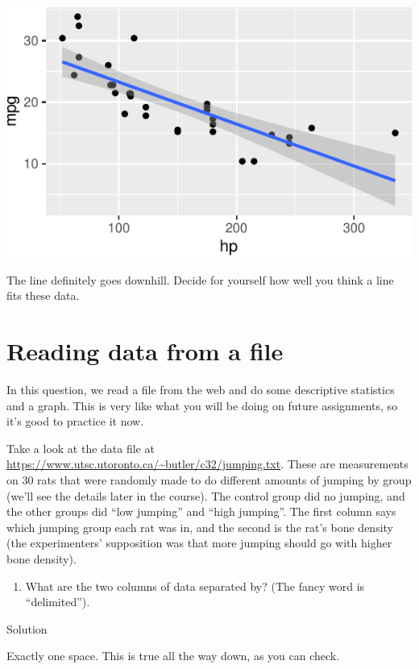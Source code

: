 \documentclass[]{tufte-book}
\providecommand{\tightlist}{%
  \setlength{\itemsep}{0pt}\setlength{\parskip}{0pt}}
\theoremstyle{definition}
\theoremstyle{definition}
\theoremstyle{definition}
\theoremstyle{remark}
\begin{document}
\includegraphics{01-getting-used_files/figure-latex/unnamed-chunk-10-1}

The line definitely goes downhill. Decide for yourself how well you
think a line fits these data.

\hypertarget{reading-data-from-a-file}{%
\section{Reading data from a file}\label{reading-data-from-a-file}}

In this question, we read a file from the web and do some descriptive
statistics and a graph. This is very like what you will be doing on
future assignments, so it's good to practice it now.

Take a look at the data file at
\url{https://www.utsc.utoronto.ca/~butler/c32/jumping.txt}. These are
measurements on 30 rats that were randomly made to do different amounts
of jumping by group (we'll see the details later in the course). The
control group did no jumping, and the other groups did ``low jumping''
and ``high jumping''. The first column says which jumping group each rat
was in, and the second is the rat's bone density (the experimenters'
supposition was that more jumping should go with higher bone density).

\begin{enumerate}
\def\labelenumi{(\alph{enumi})}
\tightlist
\item
  What are the two columns of data separated by? (The fancy word is
  ``delimited'').
\end{enumerate}

Solution

Exactly one space. This is true all the way down, as you can check.
\end{document}
